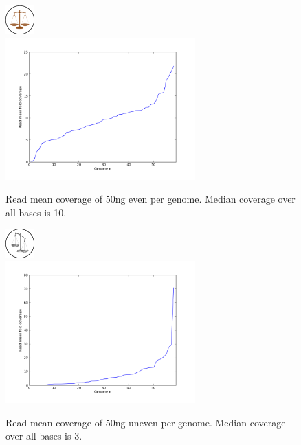 \documentclass[a4paper,12pt]{report}
\begin{document}
\begin{figure}[ht!]
  \centering
    \includegraphics[width=0.1\textwidth]{figures/logos/even.pdf}\\
  \centering
      \includegraphics[width=0.65\textwidth,trim=35 20 35 33, clip]{figures/notebooks/chris-mock-even-distribution.png}
  \caption{Read mean coverage of 50ng even per genome. Median coverage over all
  bases is 10.}
  \label{fig:coverage50ngeven}
\end{figure}
\begin{figure}[ht!]
  \centering
    \includegraphics[width=0.1\textwidth]{figures/logos/uneven.pdf}\\
  \centering
    \includegraphics[width=0.65\textwidth,trim=35 20 35 33, clip]{figures/notebooks/chris-mock-uneven-distribution.png}
  \caption{Read mean coverage of 50ng uneven per genome. Median coverage over
  all bases is 3.}
  \label{fig:coverage50nguneven}
\end{figure}
\end{document}
